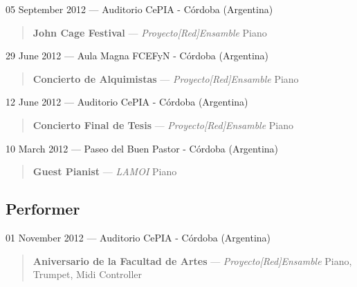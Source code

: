 \documentclass[12pt,overlapped]{res}%
\begin{document}
\begin{resume}
05 September 2012 --- Auditorio CePIA - Córdoba (Argentina)%
\begin{quote}
\par
\textbf{John Cage Festival} --- \textit{Proyecto{[}Red{]}Ensamble}
Piano
\end{quote}%


29 June 2012 --- Aula Magna FCEFyN - Córdoba (Argentina)%
\begin{quote}
\par
\textbf{Concierto de Alquimistas} --- \textit{Proyecto{[}Red{]}Ensamble}
Piano
\end{quote}%
%
%
%
12 June 2012 --- Auditorio CePIA - Córdoba (Argentina)%
\begin{quote}
\par
\textbf{Concierto Final de Tesis} --- \textit{Proyecto{[}Red{]}Ensamble}
Piano
\end{quote}%
%
%
%
10 March 2012 --- Paseo del Buen Pastor - Córdoba (Argentina)%
\begin{quote}
\par
\textbf{Guest Pianist} --- \textit{LAMOI}
Piano
\end{quote}%
%
%
%
\subsection{Performer}%
01 November 2012 --- Auditorio CePIA - Córdoba (Argentina)%
\begin{quote}
\par
\textbf{Aniversario de la Facultad de Artes} --- \textit{Proyecto{[}Red{]}Ensamble}
Piano, Trumpet, Midi Controller
\end{quote}%
%
%
%


%
%
%


\end{resume}
\end{document}
